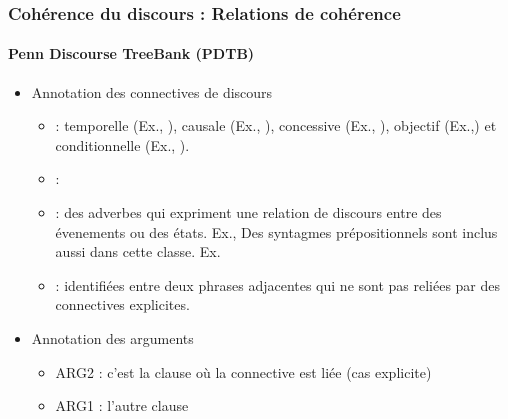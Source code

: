 \documentclass[xcolor=table]{beamer}
\begin{document}
\begin{frame}
	\frametitle{Cohérence du discours : Relations de cohérence}
	\framesubtitle{Penn Discourse TreeBank (PDTB)}
	
	\begin{itemize}
		\item Annotation des connectives de discours
		\begin{itemize}
			\item {} :  
			temporelle (Ex., ), 
			causale (Ex., ), 
			concessive (Ex., ), 
			objectif (Ex.,) et 
			conditionnelle (Ex., ).
			
			\item {} : 
			
			\item {} : des adverbes qui expriment une relation de discours entre des évenements ou des états. Ex., 
			Des syntagmes prépositionnels sont inclus aussi dans cette classe. Ex. 
			
			\item {} :  identifiées entre deux phrases adjacentes qui ne sont pas reliées par des connectives explicites.
		\end{itemize}
		\item Annotation des arguments 
		\begin{itemize}
			\item ARG2 : c'est la clause où la connective est liée (cas explicite)
			\item ARG1 : l'autre clause
		\end{itemize}
	\end{itemize}
	
\end{frame}
\end{document}
